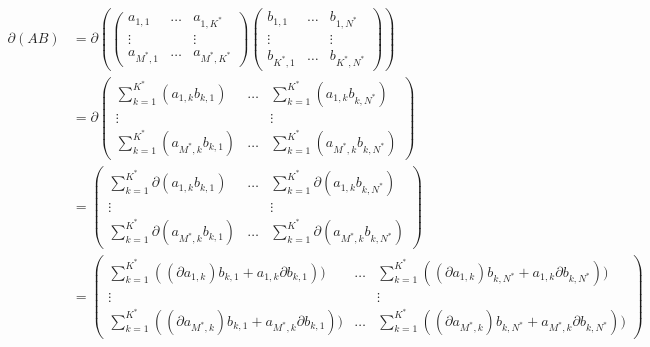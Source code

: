 \documentclass[a4paper, 10pt]{article}
\begin{document}
\begin{align*}
    \partial (AB)
    & = \partial \left(
        \begin{pmatrix}
        a_{1, 1} & \hdots & a_{1, K^*} \\
        \vdots & & \vdots \\
        a_{M^*, 1} & \hdots & a_{M^*, K^*}
        \end{pmatrix}
        \begin{pmatrix}
        b_{1, 1} & \hdots & b_{1, N^*} \\
        \vdots & & \vdots \\
        b_{K^*, 1} & \hdots & b_{K^*, N^*}
        \end{pmatrix} \right) \\
    & = \partial
        \begin{pmatrix}
        \displaystyle \sum_{k = 1}^{K^*} (a_{1, k} b_{k, 1}) & \hdots & \displaystyle \sum_{k = 1}^{K^*} (a_{1, k} b_{k, N^*}) \\
        \vdots & & \vdots \\
        \displaystyle \sum_{k = 1}^{K^*} (a_{M^*, k} b_{k, 1}) & \hdots & \displaystyle \sum_{k = 1}^{K^*} (a_{M^*, k} b_{k, N^*})
        \end{pmatrix} \\
    & = \begin{pmatrix}
        \displaystyle \sum_{k = 1}^{K^*} \partial (a_{1, k} b_{k, 1}) & \hdots & \displaystyle \sum_{k = 1}^{K^*} \partial (a_{1, k} b_{k, N^*}) \\
        \vdots & & \vdots \\
        \displaystyle \sum_{k = 1}^{K^*} \partial (a_{M^*, k} b_{k, 1}) & \hdots & \displaystyle \sum_{k = 1}^{K^*} \partial (a_{M^*, k} b_{k, N^*})
        \end{pmatrix} \\
    & = \begin{pmatrix}
        \displaystyle \sum_{k = 1}^{K^*} ((\partial a_{1, k}) b_{k, 1} + a_{1, k} \partial b_{k, 1} )) & \hdots & \displaystyle \sum_{k = 1}^{K^*} ((\partial a_{1, k}) b_{k, N^*} + a_{1, k} \partial b_{k, N^*} )) \\
        \vdots & & \vdots \\
        \displaystyle \sum_{k = 1}^{K^*} ((\partial a_{M^*, k}) b_{k, 1} + a_{M^*, k} \partial b_{k, 1} )) & \hdots & \displaystyle \sum_{k = 1}^{K^*} ((\partial a_{M^*, k}) b_{k, N^*} + a_{M^*, k} \partial b_{k, N^*} ))
        \end{pmatrix} \\

\end{align*}
\end{document}
